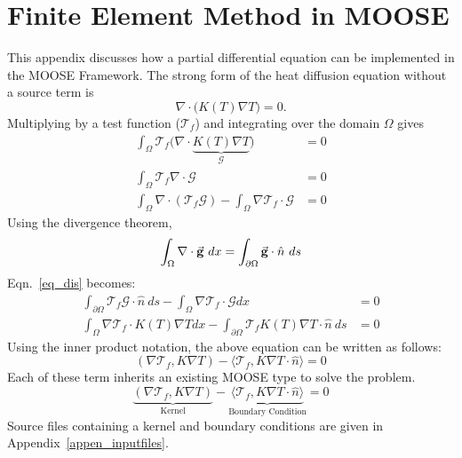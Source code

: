 \chapter{Finite Element Method in MOOSE}\label{appen_fem}
This appendix discusses how a partial differential equation can be implemented in the MOOSE Framework.
	The strong form of the heat diffusion equation without a source term is 
\begin{equation*}
	\nabla \cdot \big(K(T)\nabla T\big) = 0.
\end{equation*}
Multiplying by a test function ($\mathcal{T}_f$) and integrating over the domain $\Omega$ gives
    \begin{align}\label{eq_dis}
		\int_{\Omega} \mathcal{T}_f \big( \nabla \cdot \underbrace{K(T) \nabla T}_{\mathcal{G}} \big) &= 0 \nonumber \\
		\int_{\Omega} \mathcal{T}_f \nabla \cdot \mathcal{G} &= 0 \nonumber \\
		\int_{\Omega} \nabla \cdot (\mathcal{T}_f \mathcal{G}) - \int_{\Omega} \nabla \mathcal{T}_f \cdot \mathcal{G} &= 0
	\end{align}
Using the divergence theorem,
\begin{equation}\label{eq_div}
		\int_{\Omega} \nabla \cdot \va{g}\ dx = \int_{\partial \Omega} \va{g} \cdot \hat{n}\ ds
\end{equation}
Eqn.~\eqref{eq_dis} becomes:
	\begin{align*}
		\int_{\partial \Omega} \mathcal{T}_f \mathcal{G} \cdot \hat{n}\  ds - \int_{\Omega} \nabla \mathcal{T}_f \cdot \mathcal{G} dx  &= 0 \\
		\int_{\Omega} \nabla \mathcal{T}_f \cdot K(T) \nabla T dx - \int_{\partial \Omega} \mathcal{T}_f K(T)\nabla T \cdot \hat{n}\  ds   &= 0
	\end{align*}
Using the inner product notation, the above equation can be written as follows:
\begin{equation}
	(\nabla \mathcal{T}_f, K\nabla T) - \langle \mathcal{T}_f, K\nabla T \cdot \hat{n}  \rangle = 0
\end{equation}
Each of these term inherits an existing MOOSE type to solve the problem.
\begin{equation}
	\underbrace{(\nabla \mathcal{T}_f, K\nabla T)}_{\text{Kernel}} - \underbrace{\langle \mathcal{T}_f, K\nabla T \cdot \hat{n} \rangle}_{\text{Boundary Condition}}= 0
\end{equation}
Source files containing a kernel and boundary conditions are given in Appendix~\ref{appen_inputfiles}.

